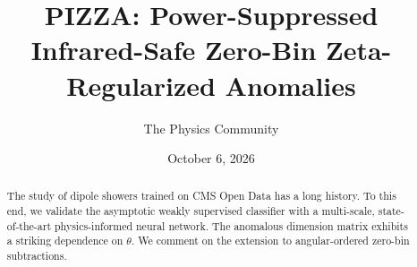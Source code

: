 \documentclass[11pt]{article}
\title{PIZZA: Power-Suppressed Infrared-Safe Zero-Bin Zeta-Regularized Anomalies}
\author{The Physics Community}
\date{October 6, 2026}
\begin{document}
\maketitle
\begin{abstract}
The study of dipole showers trained on CMS Open Data has a long history.
To this end, we validate the asymptotic weakly supervised classifier
with a multi-scale, state-of-the-art physics-informed neural network.
The anomalous dimension matrix exhibits a striking dependence on
$\theta$. We comment on the extension to angular-ordered zero-bin
subtractions.
\end{abstract}
\tableofcontents






\nocite{*}


\end{document}

